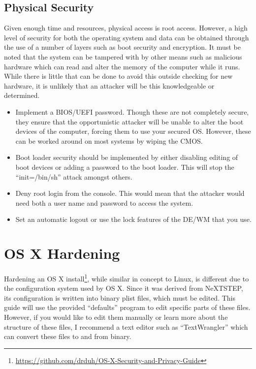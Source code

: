 				\subsection{Physical Security}
					Given enough time and resources, physical access is root access.
					However, a high level of security for both the operating system and data can be obtained through the use of a number of layers such as boot security and encryption.
					It must be noted that the system can be tampered with by other means such as malicious hardware which can read and alter the memory of the computer while it runs. While there is little that can be done to avoid this outside checking for new hardware, it is unlikely that an attacker will be this knowledgeable or determined.
					\begin{itemize}
						\item Implement a BIOS/UEFI password.
							Though these are not completely secure, they ensure that the opportunistic attacker will be unable to alter the boot devices of the computer, forcing them to use your secured OS.
							However, these can be worked around on most systems by wiping the CMOS.
						\item Boot loader security should be implemented by either disabling editing of boot devices or adding a password to the boot loader.
							This will stop the ``init=/bin/sh'' attack amongst others.
						\item Deny root login from the console.
							This would mean that the attacker would need both a user name and password to access the system.
						\item Set an automatic logout or use the lock features of the DE/WM that you use.
					\end{itemize}
	\section{OS X Hardening}
		Hardening an OS X install\footnote{\url{https://github.com/drduh/OS-X-Security-and-Privacy-Guide}}, while similar in concept to Linux, is different due to the configuration system used by OS X.
		Since it was derived from NeXTSTEP, its configuration is written into binary plist files, which must be edited.
		This guide will use the provided ``defaults'' program to edit specific parts of these files.
		However, if you would like to edit them manually or learn more about the structure of these files, I recommend a text editor such as ``TextWrangler'' which can convert these files to and from binary.

